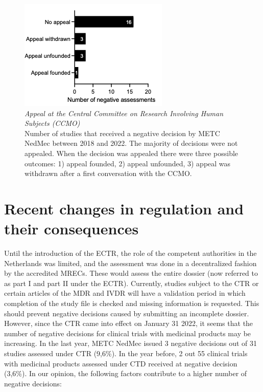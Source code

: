 \documentclass[authordate, meta]{jote-new-article}
\begin{document}
\begin{figure}
  \begin{fullwidth}

    \includegraphics[width=\linewidth]{media/Picture4.png}

    \caption{\emph{Appeal at the Central Committee on Research Involving Human Subjects (CCMO)}\\
      Number of studies that received a negative decision by METC NedMec between 2018 and 2022. The majority of decisions were not appealed. When the decision was appealed there were three possible outcomes: 1) appeal founded, 2) appeal unfounded, 3) appeal was withdrawn after a first conversation with the CCMO.}

    \label{fig:rId14}
  \end{fullwidth}
\end{figure}







\section{Recent changes in regulation and their consequences}



Until the introduction of the ECTR, the role of the competent authorities in the Netherlands was limited, and the assessment was done in a decentralized fashion by the accredited MRECs. These would assess the entire dossier (now referred to as part I and part II under the ECTR). Currently, studies subject to the CTR or certain articles of the MDR and IVDR will have a validation period in which completion of the study file is checked and missing information is requested. This should prevent negative decisions caused by submitting an incomplete dossier. However, since the CTR came into effect on January 31 2022, it seems that the number of negative decisions for clinical trials with medicinal products may be increasing. In the last year, METC NedMec issued 3 negative decisions out of 31 studies assessed under CTR (9,6\%). In the year before, 2 out 55 clinical trials with medicinal products assessed under CTD received at negative decision (3,6\%). In our opinion, the following factors contribute to a higher number of negative decisions:
\end{document}
